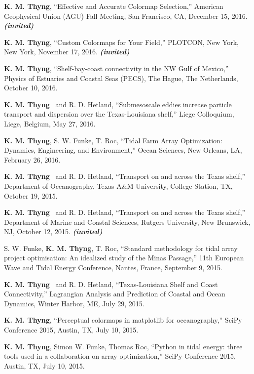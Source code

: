 \documentclass[10pt,letterpaper]{article}
\newcommand{\kmt}{\textbf{K. M. Thyng}}
\newcommand{\inv}{\textbf{\textit{(invited)}}}
\renewenvironment{itemize}{
  \begin{list}{}{
    \setlength{\leftmargin}{1.5em}
    \setlength{\itemsep}{0.25em}
    \setlength{\parskip}{0pt}
    \setlength{\parsep}{0.25em}
  }
}{
  \end{list}
}
\begin{document}
\begin{itemize}

\item \kmt, ``Effective and Accurate Colormap Selection,'' American Geophysical Union (AGU) Fall Meeting, San Francisco, CA, December 15, 2016. \inv

\item \kmt, ``Custom Colormaps for Your Field,'' PLOTCON, New York, New York, November 17, 2016. \inv

\item \kmt, ``Shelf-bay-coast connectivity in the NW Gulf of Mexico,'' Physics of Estuaries and Coastal Seas (PECS), The Hague, The Netherlands, October 10, 2016.

\item \kmt~ and R. D. Hetland, ``Submesoscale eddies increase particle transport and dispersion over the Texas-Louisiana shelf,'' Liege Colloquium, Liege, Belgium, May 27, 2016.

\item \kmt, S. W. Funke, T. Roc, ``Tidal Farm Array Optimization: Dynamics, Engineering, and Environment,'' Ocean Sciences, New Orleans, LA, February 26, 2016.

\item \kmt~ and R. D. Hetland, ``Transport on and across the Texas shelf,'' Department of Oceanography, Texas A\&M University, College Station, TX, October 19, 2015.

\item \kmt~ and R. D. Hetland, ``Transport on and across the Texas shelf,'' Department of Marine and Coastal Sciences, Rutgers University, New Brunswick, NJ, October 12, 2015. \inv

\item S. W. Funke, \kmt, T. Roc, ``Standard methodology for tidal array project optimisation: An idealized study of the Minas Passage,'' 11th European Wave and Tidal Energy Conference, Nantes, France, September 9, 2015.

\item \kmt~ and R. D. Hetland, ``Texas-Louisiana Shelf and Coast Connectivity,'' Lagrangian Analysis and Prediction of Coastal and Ocean Dynamics, Winter Harbor, ME, July 29, 2015.

\item \kmt, ``Perceptual colormaps in matplotlib for oceanography,'' SciPy Conference 2015, Austin, TX, July 10, 2015.

\item \kmt, Simon W. Funke, Thomas Roc, ``Python in tidal energy: three tools used in a collaboration on array optimization,'' SciPy Conference 2015, Austin, TX, July 10, 2015.


\end{itemize}
\end{document}
